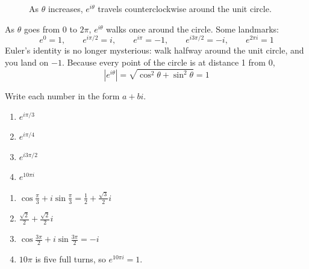 \begin{figure}[H]
\centering
{}
\caption{As $\theta$ increases, $e^{i\theta}$ travels counterclockwise around the unit circle.}
\label{fig:euler-circle}
\end{figure}

As $\theta$ goes from 0 to $2\pi$, $e^{i\theta}$ walks once around the circle. Some
landmarks:
$$e^{0} = 1, \qquad e^{i\pi/2} = i, \qquad e^{i\pi} = -1, \qquad e^{i3\pi/2} = -i, \qquad e^{2\pi i} = 1$$
Euler's identity is no longer mysterious: walk halfway around the unit circle, and
you land on $-1$. Because every point of the circle is at distance 1 from 0,
$$\left|e^{i\theta}\right| = \sqrt{\cos^2\theta + \sin^2\theta} = 1$$

\begin{Exercise}[title={Around the Circle}, label=eu_values]
Write each number in the form $a + bi$.
\begin{enumerate}
\item $e^{i\pi/3}$
\item $e^{i\pi/4}$
\item $e^{i3\pi/2}$
\item $e^{10\pi i}$
\end{enumerate}
\end{Exercise}
\begin{Answer}[ref=eu_values]
\begin{enumerate}
\item $\cos\frac{\pi}{3} + i\sin\frac{\pi}{3} = \frac{1}{2} + \frac{\sqrt{3}}{2}i$
\item $\frac{\sqrt{2}}{2} + \frac{\sqrt{2}}{2}i$
\item $\cos\frac{3\pi}{2} + i\sin\frac{3\pi}{2} = -i$
\item $10\pi$ is five full turns, so $e^{10\pi i} = 1$.
\end{enumerate}
\end{Answer}

